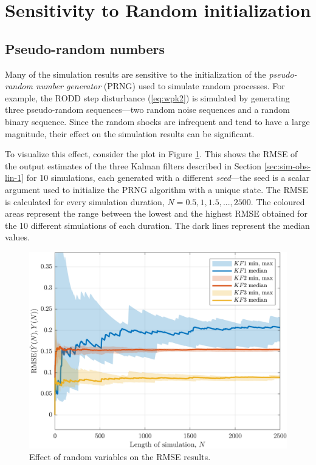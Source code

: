 \section{Sensitivity to Random initialization} \label{sec:random-init}

\subsection{Pseudo-random numbers}

Many of the simulation results are sensitive to the initialization of the \textit{pseudo-random number generator} (\gls{PRNG}) used to simulate random processes. For example, the \gls{RODD} step disturbance (\ref{eq:wpk2}) is simulated by generating three pseudo-random sequences---two random noise sequences and a random binary sequence. Since the random shocks are infrequent and tend to have a large magnitude, their effect on the simulation results can be significant.

To visualize this effect, consider the plot in Figure \ref{fig:rod-obs-sim-1-3KF-seed-crmse-statsplot}. This shows the \gls{RMSE} of the output estimates of the three Kalman filters described in Section \ref{sec:sim-obs-lin-1} for 10 simulations, each generated with a different \textit{seed}—the seed is a scalar argument used to initialize the \gls{PRNG} algorithm with a unique state. The \gls{RMSE} is calculated for every simulation duration, $N=0.5,1,1.5,...,2500$. The coloured areas represent the range between the lowest and the highest \gls{RMSE} obtained for the 10 different simulations of each duration. The dark lines represent the median values.

\begin{figure}[htp]
	\centering
	\includegraphics[width=14cm]{images/rod_obs_sim1_3KF_seed_crmse_statsplot.png}  %
	\caption{Effect of random variables on the \gls{RMSE} results.}
	\label{fig:rod-obs-sim-1-3KF-seed-crmse-statsplot}
\end{figure}  %

